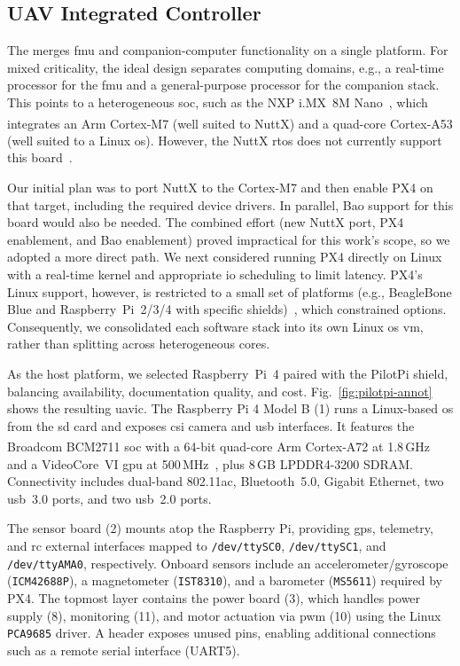 \subsection{UAV Integrated Controller}
\label{sec:uav-integr-contr}
The  merges \gls{fmu} and companion-computer functionality on
a single platform. For mixed criticality, the ideal design separates computing
domains, e.g., a real-time processor for the \gls{fmu} and a general-purpose
processor for the companion stack. This points to a heterogeneous \gls{soc},
such as the NXP i.MX~8M Nano~\cite{imx8mn}, which integrates an Arm\textsuperscript{\textregistered}
Cortex\textsuperscript{\textregistered}-M7 (well suited to NuttX) and a quad-core
Cortex\textsuperscript{\textregistered}-A53 (well suited to a Linux \gls{os}). However, the NuttX \gls{rtos}
does not currently support this board~\cite{nuttx-platforms}.

Our initial plan was to port NuttX to the Cortex-M7 and then enable PX4 on that
target, including the required device drivers. In parallel, Bao support for this
board would also be needed. The combined effort (new NuttX port, PX4 enablement,
and Bao enablement) proved impractical for this work’s scope, so we adopted a
more direct path.
%
We next considered running PX4 directly on Linux with a real-time kernel and
appropriate \gls{io} scheduling to limit latency. PX4’s Linux support, however,
is restricted to a small set of platforms (e.g., BeagleBone Blue and
Raspberry~Pi~2/3/4 with specific shields)~\cite{px4-experimental-autopilot},
which constrained options. Consequently, we consolidated each software stack
into its own Linux \gls{os} \gls{vm}, rather than splitting across heterogeneous cores.

As the host platform, we selected Raspberry~Pi~4 paired with the PilotPi shield,
balancing availability, documentation quality, and cost. Fig.~\ref{fig:pilotpi-annot}
shows the resulting \gls{uavic}. The Raspberry Pi 4 Model B (1) runs a Linux-based
\gls{os} from the \gls{sd} card and exposes \gls{csi} camera and \gls{usb}
interfaces. It features the Broadcom BCM2711 \gls{soc} with a 64-bit quad-core
Arm\textsuperscript{\textregistered} Cortex\textsuperscript{\textregistered}-A72 at 1.8\,GHz and a
VideoCore~VI \gls{gpu} at 500\,MHz~\cite{rpi4-specs,rpi4-bcm2711}, plus 8\,GB
LPDDR4-3200 SDRAM. Connectivity includes dual-band 802.11ac, Bluetooth~5.0,
Gigabit Ethernet, two \gls{usb}~3.0 ports, and two \gls{usb}~2.0 ports.

The sensor board (2) mounts atop the Raspberry Pi, providing \gls{gps}, telemetry,
and \gls{rc} external interfaces mapped to \lstinline{/dev/ttySC0}, \lstinline{/dev/ttySC1},
and \lstinline{/dev/ttyAMA0}, respectively. Onboard sensors include an accelerometer/gyroscope
(\lstinline{ICM42688P}), a magnetometer (\lstinline{IST8310}), and a barometer
(\lstinline{MS5611}) required by PX4.
%
The topmost layer contains the power board (3), which handles power supply (8),
monitoring (11), and motor actuation via \gls{pwm} (10) using the Linux
\lstinline{PCA9685} driver. A header exposes unused pins, enabling additional
connections such as a remote serial interface (UART5).

